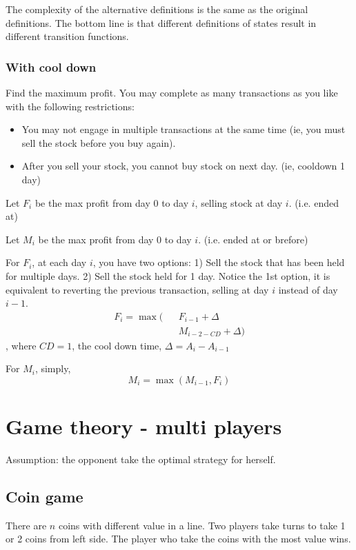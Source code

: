 {The complexity of the alternative definitions is the same as the original definitions. The bottom line is that different definitions of states result in different transition functions.
\subsubsection{With cool down}

Find the maximum profit. You may complete as many transactions as you like with the following restrictions:
\begin{itemize}
\item You may not engage in multiple transactions at the same time (ie, you must sell the stock before you buy again).
\item After you sell your stock, you cannot buy stock on next day. (ie, cooldown 1 day)
\end{itemize}

Let $F_i$ be the max profit from day 0 to day $i$, selling stock at day $i$. (i.e. ended at)

Let $M_i$ be the max profit from day 0 to day $i$. (i.e. ended at or brefore)

For $F_i$, at each day $i$, you have two options: 1) Sell the stock that has been held for multiple days. 2) Sell the stock held for 1 day.
Notice the 1st option, it is equivalent to reverting the previous transaction, selling at day $i$ instead of day $i-1$.
\begin{eqnarray*}
F_{i}= \max\big(&&F_{i-1}+\Delta \\
&&M_{i-2-CD}+\Delta \big)
\end{eqnarray*}
, where $CD=1$, the cool down time, $\Delta = A_i-A_{i-1}$ 

For $M_i$, simply, 
$$
M_i = \max(M_{i-1}, F_i)
$$


\section{Game theory - multi players}
Assumption: the opponent take the optimal strategy for herself. 

\subsection{Coin game}
 There are $n$ coins with different value in a line. Two players take turns to take 1 or 2 coins from left side. The player who take the coins with the most value wins.

}
